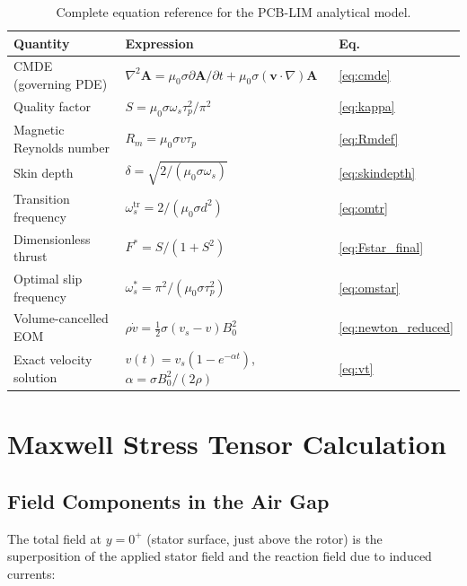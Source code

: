 \documentclass[12pt, a4paper]{article}
\theoremstyle{plain}
\theoremstyle{definition}
\newcommand{\vA}{\mathbf{A}}
\newcommand{\vv}{\mathbf{v}}
\newcommand{\taup}{\tau_p}
\newcommand{\oms}{\omega_s}
\newcommand{\omstar}{\omega_s^*}
\newcommand{\sig}{\sigma}
\newcommand{\muZ}{\mu_0}
\newcommand{\Rm}{R_m}
\newcommand{\Fstar}{F^*}
\begin{document}
\begin{table}[h!]
  \centering
  \renewcommand{\arraystretch}{1.5}
  \begin{tabular}{lll}
    \toprule
    \textbf{Quantity} & \textbf{Expression} & \textbf{Eq.}\\
    \midrule
    CMDE (governing PDE) &
      $\nabla^2\vA = \muZ\sig\partial\vA/\partial t + \muZ\sig(\vv\cdot\nabla)\vA$ &
      \eqref{eq:cmde}\\
    Quality factor &
      $S = \muZ\sig\oms\taup^2/\pi^2$ &
      \eqref{eq:kappa}\\
    Magnetic Reynolds number &
      $\Rm = \muZ\sig v\taup$ &
      \eqref{eq:Rmdef}\\
    Skin depth &
      $\delta = \sqrt{2/(\muZ\sig\oms)}$ &
      \eqref{eq:skindepth}\\
    Transition frequency &
      $\oms^{\mathrm{tr}} = 2/(\muZ\sig d^2)$ &
      \eqref{eq:omtr}\\
    Dimensionless thrust &
      $\Fstar = S/(1+S^2)$ &
      \eqref{eq:Fstar_final}\\
    Optimal slip frequency &
      $\omstar = \pi^2/(\muZ\sig\taup^2)$ &
      \eqref{eq:omstar}\\
    Volume-cancelled EOM &
      $\rho\dot{v} = \tfrac{1}{2}\sig(v_s-v)B_0^2$ &
      \eqref{eq:newton_reduced}\\
    Exact velocity solution &
      $v(t) = v_s(1 - e^{-\alpha t})$, $\alpha = \sig B_0^2/(2\rho)$ &
      \eqref{eq:vt}\\
    \bottomrule
  \end{tabular}
  \caption{Complete equation reference for the PCB-LIM analytical model.}
  \label{tab:equations}
\end{table}


\appendix
\section{Maxwell Stress Tensor Calculation}
\label{app:mst_calc}

\subsection{Field Components in the Air Gap}

The total field at $y = 0^+$ (stator surface, just above the rotor) is the superposition
of the applied stator field and the reaction field due to induced currents:
\end{document}
